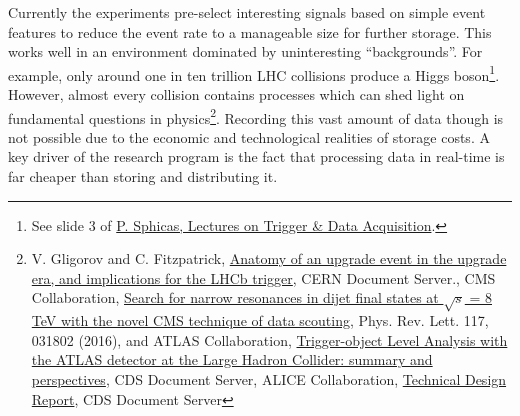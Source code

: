 Currently the experiments pre-select interesting signals based on simple event features to reduce the event rate to a manageable size for further storage. This works well in an environment dominated by uninteresting ``backgrounds''.
For example, only around one in ten trillion LHC collisions produce a Higgs boson\footnote{See slide 3 of \href{https://indico.cern.ch/event/a062849/material/1/1.pdf}{P. Sphicas, Lectures on Trigger \& Data Acquisition}.}.
However, almost every collision contains processes which can shed light on fundamental questions in physics\footnote{V. Gligorov and C. Fitzpatrick, \href{http://cds.cern.ch/record/1670985}{Anatomy of an upgrade event in the upgrade era, and implications for the LHCb trigger}, CERN Document Server., CMS Collaboration, \href{https://arxiv.org/abs/1604.08907}{Search for narrow resonances in dijet final states at $\sqrt{s}$ = 8 TeV with the novel CMS technique of data scouting}, Phys. Rev. Lett. 117, 031802 (2016), and ATLAS Collaboration, \href{https://cds.cern.ch/record/2295739}{Trigger-object Level Analysis with the ATLAS detector at the Large Hadron Collider: summary and perspectives}, CDS Document Server, ALICE Collaboration, \href{https://cds.cern.ch/record/2011297/files/ALICE-TDR-019.pdf}{Technical Design Report}, CDS Document Server}. Recording this vast amount of data though is not possible due to the economic and technological realities of storage costs. A key driver of the \acronym research program is the fact that processing data in real-time is far cheaper than storing and distributing it. 
